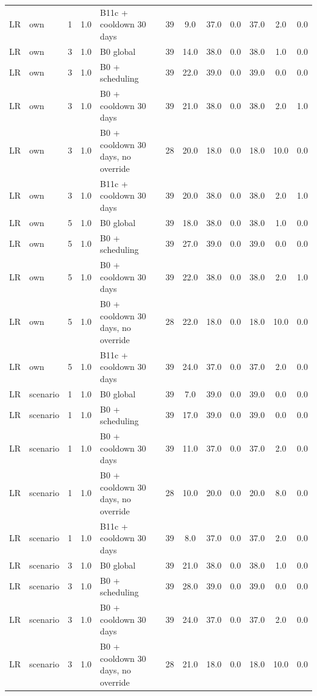 \begin{longtable}{lllllccccccc}
LR & own & 1 & 1.0 & B11c + cooldown 30 days & 39 & 9.0 & 37.0 & 0.0 & 37.0 & 2.0 & 0.0 \\
LR & own & 3 & 1.0 & B0 global & 39 & 14.0 & 38.0 & 0.0 & 38.0 & 1.0 & 0.0 \\
LR & own & 3 & 1.0 & B0 + scheduling & 39 & 22.0 & 39.0 & 0.0 & 39.0 & 0.0 & 0.0 \\
LR & own & 3 & 1.0 & B0 + cooldown 30 days & 39 & 21.0 & 38.0 & 0.0 & 38.0 & 2.0 & 1.0 \\
LR & own & 3 & 1.0 & B0 + cooldown 30 days, no override & 28 & 20.0 & 18.0 & 0.0 & 18.0 & 10.0 & 0.0 \\
LR & own & 3 & 1.0 & B11c + cooldown 30 days & 39 & 20.0 & 38.0 & 0.0 & 38.0 & 2.0 & 1.0 \\
LR & own & 5 & 1.0 & B0 global & 39 & 18.0 & 38.0 & 0.0 & 38.0 & 1.0 & 0.0 \\
LR & own & 5 & 1.0 & B0 + scheduling & 39 & 27.0 & 39.0 & 0.0 & 39.0 & 0.0 & 0.0 \\
LR & own & 5 & 1.0 & B0 + cooldown 30 days & 39 & 22.0 & 38.0 & 0.0 & 38.0 & 2.0 & 1.0 \\
LR & own & 5 & 1.0 & B0 + cooldown 30 days, no override & 28 & 22.0 & 18.0 & 0.0 & 18.0 & 10.0 & 0.0 \\
LR & own & 5 & 1.0 & B11c + cooldown 30 days & 39 & 24.0 & 37.0 & 0.0 & 37.0 & 2.0 & 0.0 \\
LR & scenario & 1 & 1.0 & B0 global & 39 & 7.0 & 39.0 & 0.0 & 39.0 & 0.0 & 0.0 \\
LR & scenario & 1 & 1.0 & B0 + scheduling & 39 & 17.0 & 39.0 & 0.0 & 39.0 & 0.0 & 0.0 \\
LR & scenario & 1 & 1.0 & B0 + cooldown 30 days & 39 & 11.0 & 37.0 & 0.0 & 37.0 & 2.0 & 0.0 \\
LR & scenario & 1 & 1.0 & B0 + cooldown 30 days, no override & 28 & 10.0 & 20.0 & 0.0 & 20.0 & 8.0 & 0.0 \\
LR & scenario & 1 & 1.0 & B11c + cooldown 30 days & 39 & 8.0 & 37.0 & 0.0 & 37.0 & 2.0 & 0.0 \\
LR & scenario & 3 & 1.0 & B0 global & 39 & 21.0 & 38.0 & 0.0 & 38.0 & 1.0 & 0.0 \\
LR & scenario & 3 & 1.0 & B0 + scheduling & 39 & 28.0 & 39.0 & 0.0 & 39.0 & 0.0 & 0.0 \\
LR & scenario & 3 & 1.0 & B0 + cooldown 30 days & 39 & 24.0 & 37.0 & 0.0 & 37.0 & 2.0 & 0.0 \\
LR & scenario & 3 & 1.0 & B0 + cooldown 30 days, no override & 28 & 21.0 & 18.0 & 0.0 & 18.0 & 10.0 & 0.0 \\

\end{longtable}
